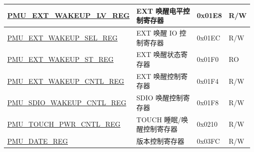 \begin{longtable}{ | l | L{6cm} | l | l | }
\hyperref[regdesc:PMUEXTWAKEUPLVREG]{PMU\_EXT\_WAKEUP\_LV\_REG} & EXT 唤醒电平控制寄存器 & 0x01E8 & R/W \\ \hline
\hyperref[regdesc:PMUEXTWAKEUPSELREG]{PMU\_EXT\_WAKEUP\_SEL\_REG} & EXT 唤醒 IO 控制寄存器 & 0x01EC & R/W \\ \hline
\hyperref[regdesc:PMUEXTWAKEUPSTREG]{PMU\_EXT\_WAKEUP\_ST\_REG} & EXT 唤醒状态寄存器 & 0x01F0 & RO \\ \hline
\hyperref[regdesc:PMUEXTWAKEUPCNTLREG]{PMU\_EXT\_WAKEUP\_CNTL\_REG} & EXT 唤醒控制寄存器 & 0x01F4 & R/W \\ \hline
\hyperref[regdesc:PMUSDIOWAKEUPCNTLREG]{PMU\_SDIO\_WAKEUP\_CNTL\_REG} & SDIO 唤醒控制寄存器 & 0x01F8 & R/W \\ \hline

\hyperref[regdesc:PMUTOUCHPWRCNTLREG]{PMU\_TOUCH\_PWR\_CNTL\_REG} & TOUCH 睡眠/唤醒控制寄存器 & 0x0210 & R/W \\ \hline

\hyperref[regdesc:PMUDATEREG]{PMU\_DATE\_REG} & 版本控制寄存器& 0x03FC & R/W \\ \hline

\end{longtable}
